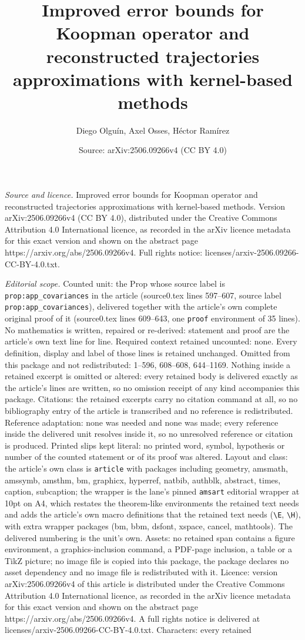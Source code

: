 \documentclass[10pt,a4paper]{amsart}
\title[Improved error bounds for Koopman operator and reconstructed]{Improved error bounds for Koopman operator and reconstructed trajectories approximations with kernel-based methods}
\author{Diego Olgu\'in, Axel Osses, H\'ector Ram\'irez}
\date{Source: arXiv:2506.09266v4 (CC BY 4.0)}
\begin{document}
\maketitle

\noindent\emph{Source and licence.} Improved error bounds for Koopman operator and reconstructed trajectories approximations with kernel-based methods. Version arXiv:2506.09266v4 (CC BY 4.0), distributed under the Creative Commons Attribution 4.0 International licence, as recorded in the arXiv licence metadata for this exact version and shown on the abstract page https://arxiv.org/abs/2506.09266v4. Full rights notice: licenses/arxiv-2506.09266-CC-BY-4.0.txt.\par\smallskip

\noindent\textit{Editorial scope.} Counted unit: the Prop whose source label is \texttt{prop:app\_covariances} in the article (source0.tex lines 597--607, source label \texttt{prop:app\_covariances}), delivered together with the article's own complete original proof of it (source0.tex lines 609--643, one \texttt{proof} environment of 35 lines). No mathematics is written, repaired or re-derived: statement and proof are the article's own text line for line. Required context retained uncounted: none. Every definition, display and label of those lines is retained unchanged. Omitted from this package and not redistributed: 1--596, 608--608, 644--1169. Nothing inside a retained excerpt is omitted or altered: every retained body is delivered exactly as the article's lines are written, so no omission receipt of any kind accompanies this package. Citations: the retained excerpts carry no citation command at all, so no bibliography entry of the article is transcribed and no reference is redistributed. Reference adaptation: none was needed and none was made; every reference inside the delivered unit resolves inside it, so no unresolved reference or citation is produced. Printed slips kept literal: no printed word, symbol, hypothesis or number of the counted statement or of its proof was altered. Layout and class: the article's own class is \texttt{article} with packages including geometry, amsmath, amssymb, amsthm, bm, graphicx, hyperref, natbib, authblk, abstract, times, caption, subcaption; the wrapper is the lane's pinned \texttt{amsart} editorial wrapper at 10pt on A4, which restates the theorem-like environments the retained text needs and adds the article's own macro definitions that the retained text needs (\texttt{\textbackslash E}, \texttt{\textbackslash H}), with extra wrapper packages (bm, bbm, dsfont, xspace, cancel, mathtools). The delivered numbering is the unit's own. Assets: no retained span contains a figure environment, a graphics-inclusion command, a PDF-page inclusion, a table or a TikZ picture; no image file is copied into this package, the package declares no asset dependency and no image file is redistributed with it. Licence: version arXiv:2506.09266v4 of this article is distributed under the Creative Commons Attribution 4.0 International licence, as recorded in the arXiv licence metadata for this exact version and shown on the abstract page https://arxiv.org/abs/2506.09266v4. A full rights notice is delivered at licenses/arxiv-2506.09266-CC-BY-4.0.txt. Characters: every retained 
\end{document}
